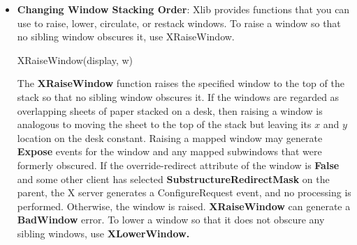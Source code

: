 \documentclass{report}
\begin{document}
\begin{itemize}
            \bigbreak \noindent 
            If the override-redirect flag of the window is False and some other client has selected \textbf{SubstructureRedirectMask} on the parent, the X server generates a ConfigureRequest event, and no further processing is performed. Otherwise, the window size and location are changed.
            \bigbreak \noindent 
            \textbf{XMoveResizeWindow} can generate \textbf{BadValue} and \textbf{BadWindow} errors.
            \bigbreak \noindent 
            To change the border width of a given window, use \textbf{XSetWindowBorderWidth.}
            \bigbreak \noindent 
            \begin{cppcode}
                XSetWindowBorderWidth (Display* display, Window w, unsigned int width)
            \end{cppcode}
            \bigbreak \noindent 
            The \textbf{XSetWindowBorderWidth} function sets the specified window’s border width to the specified width. 
            \bigbreak \noindent 
            \textbf{XSetWindowBorderWidth} can generate a \textbf{BadWindow} error.
        \item \textbf{Changing Window Stacking Order}: Xlib provides functions that you can use to raise, lower, circulate, or restack windows. 
            \bigbreak \noindent 
            To raise a window so that no sibling window obscures it, use XRaiseWindow.
            \bigbreak \noindent 
            \begin{cppcode}
                XRaiseWindow(display, w)
            \end{cppcode}
            The \textbf{XRaiseWindow} function raises the specified window to the top of the stack so that no sibling window obscures it. If the windows are regarded as overlapping sheets of paper stacked on a desk, then raising a window is analogous to moving the sheet to the top of the stack but leaving its $x$ and $y$ location on the desk constant. Raising a mapped window may generate \textbf{Expose} events for the window and any mapped subwindows that were formerly obscured.
            \bigbreak \noindent 
            If the override-redirect attribute of the window is \textbf{False} and some other client has selected \textbf{SubstructureRedirectMask} on the parent, the X server generates a ConfigureRequest event, and no processing is performed. Otherwise, the window is raised.
            \bigbreak \noindent 
            \textbf{XRaiseWindow} can generate a \textbf{BadWindow} error.
            \bigbreak \noindent 
            To lower a window so that it does not obscure any sibling windows, use \textbf{XLowerWindow.}

\end{itemize}
\end{document}
